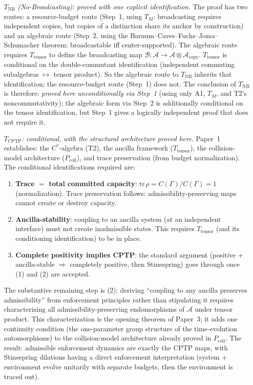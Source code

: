 \documentclass[11pt]{article}
\theoremstyle{remark}
\begin{document}
\smallskip\noindent\textit{$T_{\mathrm{NB}}$ (No-Broadcasting): proved with one explicit identification.}  The proof has two routes: a resource-budget route (Step~1, using $T_M$: broadcasting requires independent copies, but copies of a distinction share its anchor by construction) and an algebraic route (Step~2, using the Barnum--Caves--Fuchs--Jozsa--Schumacher theorem: broadcastable iff center-supported).  The algebraic route requires $T_{\mathrm{tensor}}$ to define the broadcasting map $\mathcal{B}: \mathcal{A} \to \mathcal{A} \otimes \mathcal{A}_{\mathrm{copy}}$.  $T_{\mathrm{tensor}}$ is conditional on the double-commutant identification (independent commuting subalgebras $\mapsto$ tensor product).  So the algebraic route to $T_{\mathrm{NB}}$ inherits that identification; the resource-budget route (Step~1) does not.  The conclusion of $T_{\mathrm{NB}}$ is therefore: \emph{proved here unconditionally via Step~1} (using only A1, $T_M$, and T2's noncommutativity); the algebraic form via Step~2 is additionally conditional on the tensor identification, but Step~1 gives a logically independent proof that does not require it.

\smallskip\noindent\textit{$T_{\mathrm{CPTP}}$: conditional, with the structural architecture proved here.}  Paper~1 establishes: the $C^*$-algebra (T2), the ancilla framework ($T_{\mathrm{tensor}}$), the collision-model architecture ($P_{\mathrm{coll}}$), and trace preservation (from budget normalization).  The conditional identifications required are:
\begin{enumerate}[nosep,leftmargin=2em]
\item \textbf{Trace $=$ total committed capacity}: $\mathrm{tr}\,\rho = C(\Gamma)/C(\Gamma) = 1$ (normalization).  Trace preservation follows: admissibility-preserving maps cannot create or destroy capacity.
\item \textbf{Ancilla-stability}: coupling to an ancilla system (at an independent interface) must not create inadmissible states.  This requires $T_{\mathrm{tensor}}$ (and its conditioning identification) to be in place.
\item \textbf{Complete positivity implies CPTP}: the standard argument (positive + ancilla-stable $\Rightarrow$ completely positive, then Stinespring) goes through once (1) and (2) are accepted.
\end{enumerate}
The substantive remaining step is (2): deriving ``coupling to any ancilla preserves admissibility'' from enforcement principles rather than stipulating it requires characterizing all admissibility-preserving endomorphisms of $\mathcal{A}$ under tensor product.  This characterization is the opening theorem of Paper~3; it adds one continuity condition (the one-parameter group structure of the time-evolution automorphisms) to the collision-model architecture already proved in $P_{\mathrm{coll}}$.  The result: admissible enforcement dynamics are exactly the CPTP maps, with Stinespring dilations having a direct enforcement interpretation (system + environment evolve unitarily with separate budgets, then the environment is traced out).
\end{document}
